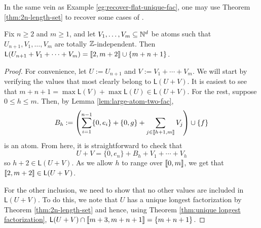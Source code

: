 \begin{rk}
In the same vein as Example \ref{eg:recover-flat-unique-fac}, one may use Theorem \ref{thm:2n-length-set} to recover some cases of \cite[Proposition 4.8]{fan-tringali18}.
\end{rk}


\begin{cor} \label{thm:int-point-construction}
Fix $n\ge 2$ and $m\ge 1$, and let $V_1,\dots, V_m \subseteq \mathbb{N}^d$ be atoms such that $U_{n+1},V_1,\dots, V_m$ are totally $\mathbb{Z}$-independent.
Then $\mathsf{L}(U_{n+1}+V_1+\cdots+V_m) = \llbracket 2,m+2 \rrbracket \cup \{m+n+1\}$.
\end{cor}

\begin{proof}
For convenience, let $U := U_{n+1}$ and $V := V_1 + \cdots + V_m$.
We will start by verifying the values that most clearly belong to $\mathsf{L}(U+V)$.
It is easiest to see that $m+n+1 =\max\mathsf{L}(V)+\max\mathsf{L}(U) \in \mathsf{L}(U+V)$.
For the rest, suppose $0\le h \le m$.
Then, by Lemma \ref{lem:large-atom-two-fac}, 
\[B_h := \left( \sum_{i=1}^{n-1} \{0,e_i\} + \{0,g\} + \sum_{j\in \llbracket h+1,m \rrbracket} V_j \right) \cup \{f\} \]
is an atom.
From here, it is straightforward to check that
\[ U+ V = \{0,e_n\} + B_h + V_1 + \cdots + V_h \]
so $h+2 \in \mathsf{L}(U+V)$.
As we allow $h$ to range over $\llbracket 0,m \rrbracket$, we get that $\llbracket 2,m+2 \rrbracket \in \mathsf{L}(U+V)$.

For the other inclusion, we need to show that no other values are included in $\mathsf{L}(U+V)$.
To do this, we note that $U$ has a unique longest factorization by Theorem \ref{thm:2n-length-set} and hence, using Theorem \ref{thm:unique longest factorization}, $\mathsf{L}(U+V) \cap \llbracket m+3, m+n+1 \rrbracket = \{m+n+1\}$.
\end{proof}



